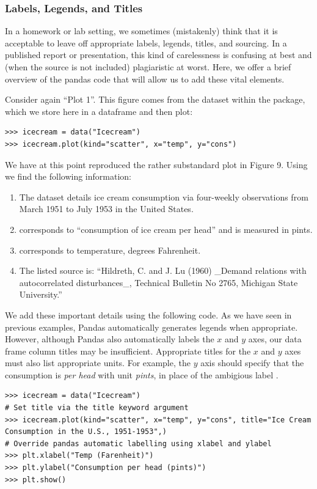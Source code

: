 \subsubsection*{Labels, Legends, and Titles}
In a homework or lab setting, we sometimes (mistakenly) think that it is acceptable to leave off appropriate labels, legends, titles, and sourcing.
In a published report or presentation, this kind of carelessness is confusing at best and (when the source is not included) plagiaristic at worst.
Here, we offer a brief overview of the pandas code that will allow us to add these vital elements.

Consider again ``Plot 1''. 
This figure comes from the  dataset within the  package, which we store here in a dataframe and then plot:
\begin{lstlisting}
>>> icecream = data("Icecream")
>>> icecream.plot(kind="scatter", x="temp", y="cons")
\end{lstlisting}

We have at this point reproduced the rather substandard plot in Figure 9.
Using  we find the following information:
\begin{enumerate}
    \item The dataset details ice cream consumption via four-weekly observations from March 1951 to July 1953 in the United States.
    \item {} corresponds to ``consumption of ice cream per head'' and is measured in pints.
    \item {} corresponds to temperature, degrees Fahrenheit.
    \item The listed source is: ``Hildreth, C. and J. Lu (1960) \_Demand relations with autocorrelated disturbances\_, Technical Bulletin No 2765, Michigan State University.''
\end{enumerate}

We add these important details using the following code.
As we have seen in previous examples, Pandas automatically generates legends when appropriate.
However, although Pandas also automatically labels the $x$ and $y$ axes, our data frame column titles may be insufficient.
Appropriate titles for the $x$ and $y$ axes must also list appropriate units. 
For example, the $y$ axis should specify that the consumption is \emph{per head} with unit \emph{pints}, in place of the ambigious label .
\begin{lstlisting}
>>> icecream = data("Icecream")
# Set title via the title keyword argument
>>> icecream.plot(kind="scatter", x="temp", y="cons", title="Ice Cream Consumption in the U.S., 1951-1953",)
# Override pandas automatic labelling using xlabel and ylabel
>>> plt.xlabel("Temp (Farenheit)")
>>> plt.ylabel("Consumption per head (pints)")
>>> plt.show()
\end{lstlisting}

